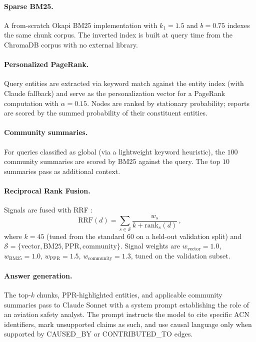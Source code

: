 \documentclass[10pt,a4paper]{article}
\begin{document}
\paragraph{Sparse BM25.}
A from-scratch Okapi BM25 implementation
\citep{robertson2009bm25} with $k_1 = 1.5$ and $b = 0.75$ indexes the
same chunk corpus. The inverted index is built at query time from the
ChromaDB corpus with no external library.

\paragraph{Personalized PageRank.}
Query entities are extracted via keyword match against the entity
index (with Claude fallback) and serve as the personalization vector
for a PageRank computation \citep{page1999pagerank} with
$\alpha = 0.15$. Nodes are ranked by stationary probability; reports
are scored by the summed probability of their constituent entities.

\paragraph{Community summaries.}
For queries classified as global (via a lightweight keyword
heuristic), the $100$ community summaries are scored by BM25 against
the query. The top $10$ summaries pass as additional context.

\paragraph{Reciprocal Rank Fusion.}
Signals are fused with RRF \citep{cormack2009rrf}:
\begin{equation}
\text{RRF}(d) = \sum_{s \in \mathcal{S}} \frac{w_s}{k + \text{rank}_s(d)}\,,
\label{eq:rrf}
\end{equation}
where $k = 45$ (tuned from the standard $60$ on a held-out validation
split) and $\mathcal{S} = \{\text{vector}, \text{BM25}, \text{PPR},
\text{community}\}$. Signal weights are $w_{\text{vector}} = 1.0$,
$w_{\text{BM25}} = 1.0$, $w_{\text{PPR}} = 1.5$,
$w_{\text{community}} = 1.3$, tuned on the validation subset.

\paragraph{Answer generation.}
The top-$k$ chunks, PPR-highlighted entities, and applicable community
summaries pass to Claude Sonnet with a system prompt establishing the
role of an aviation safety analyst. The prompt instructs the model to
cite specific ACN identifiers, mark unsupported claims as such, and
use causal language only when supported by \textsc{CAUSED\_BY} or
\textsc{CONTRIBUTED\_TO} edges.
\end{document}
